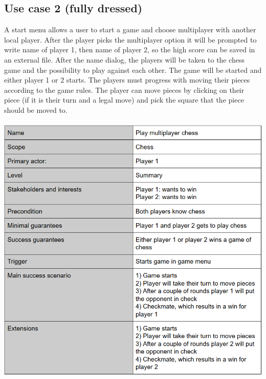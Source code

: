 \documentclass{article}
\begin{document}
        \subsection{Use case 2 (fully dressed)}
        A start menu allows a user to start a game and choose multiplayer with 
        another local player. After the player picks the multiplayer option it 
        will be prompted to write name of player 1, then name of player 2, so 
        the high score can be saved in an external file. After the name dialog,
        the players will be taken to the chess game and the possibility to play
        against each other. The game will be started and either player 1 or 2 starts.
        The players must progress with moving their pieces according to the game rules.
        The player can move pieces by clicking on their piece (if it is their 
        turn and a legal move) and pick the square that the piece should be moved
        to. \\ \\
        \includegraphics[width=\linewidth]{play-multiplayer.png}
        
\end{document}
